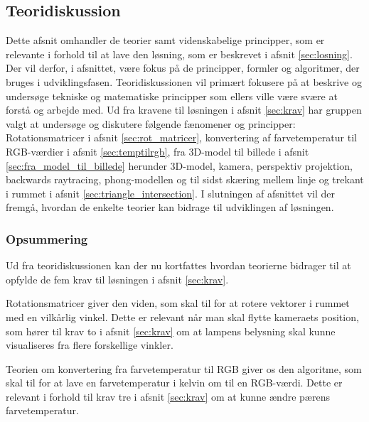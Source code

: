 \subsection{Teoridiskussion}
\label{sec:teori}

Dette afsnit omhandler de teorier samt videnskabelige principper, som er relevante i forhold til at lave den løsning, som er beskrevet i afsnit \ref{sec:losning}. Der vil derfor, i afsnittet, være fokus på de principper, formler og algoritmer, der bruges i udviklingsfasen. Teoridiskussionen vil primært fokusere på at beskrive og undersøge tekniske og matematiske principper som ellers ville være svære at forstå og arbejde med. Ud fra kravene til løsningen i afsnit \ref{sec:krav} har gruppen valgt at undersøge og diskutere følgende fænomener og principper: Rotationsmatricer i afsnit \ref{sec:rot_matricer}, konvertering af farvetemperatur til RGB-værdier i afsnit \ref{sec:temptilrgb}, fra 3D-model til billede i afsnit \ref{sec:fra_model_til_billede} herunder 3D-model, kamera, perspektiv projektion, backwards raytracing, phong-modellen og til sidst skæring mellem linje og trekant i rummet i afsnit \ref{sec:triangle_intersection}. I slutningen af afsnittet vil der fremgå, hvordan de enkelte teorier kan bidrage til udviklingen af løsningen.











\subsubsection*{Opsummering}

Ud fra teoridiskussionen kan der nu kortfattes hvordan teorierne bidrager til at opfylde de fem krav til løsningen i afsnit \ref{sec:krav}. 

Rotationsmatricer giver den viden, som skal til for at rotere vektorer i rummet med en vilkårlig vinkel. Dette er relevant når man skal flytte kameraets position, som hører til krav to i afsnit \ref{sec:krav} om at lampens belysning skal kunne visualiseres fra flere forskellige vinkler.

Teorien om konvertering fra farvetemperatur til RGB giver os den algoritme, som skal til for at lave en farvetemperatur i kelvin om til en RGB-værdi. Dette er relevant i forhold til krav tre i afsnit \ref{sec:krav} om at kunne ændre pærens farvetemperatur. 

